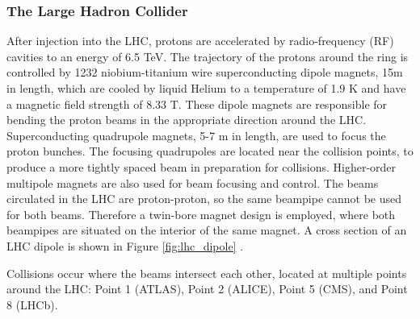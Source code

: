 \subsubsection{The Large Hadron Collider}
After injection into the LHC, protons are accelerated by radio-frequency (RF) cavities to an energy of 6.5 TeV. 
The trajectory of the protons around the ring is controlled by 1232 niobium-titanium wire superconducting dipole magnets, 15m in length, which are cooled by liquid Helium to a temperature of 1.9 K and have a magnetic field strength of 8.33 T. These dipole magnets are responsible for bending the proton beams in the appropriate direction around the LHC. Superconducting quadrupole magnets, 5-7 m in length, are used to focus the proton bunches.  The focusing quadrupoles are located near the collision points, to produce a more tightly spaced beam in preparation for collisions. Higher-order multipole magnets are also used for beam focusing and control. 
The beams circulated in the LHC are proton-proton, so the same beampipe cannot be used for both beams. Therefore a twin-bore magnet design is employed, where both beampipes are situated on the interior of the same magnet. A cross section of an LHC dipole is shown in Figure \ref{fig:lhc_dipole} \cite{Bruning:2004ej}.


Collisions occur where the beams intersect each other, located at multiple points around the LHC: Point 1 (ATLAS), Point 2 (ALICE), Point 5 (CMS), and Point 8 (LHCb). 